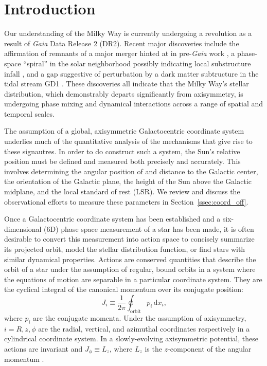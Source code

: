 \documentclass[twocolumn]{aastex62}
\newcommand{\beq}{\begin{equation}}
\newcommand{\eeq}{\end{equation}}
\begin{document}

\section{Introduction} \label{sec:intro} Our understanding of the Milky Way is
currently undergoing a revolution as a result of \textit{Gaia} Data Release 2
(DR2). Recent major discoveries include the affirmation of remnants of a major
merger \citep{2018ApJ...860L..11K, 2018MNRAS.478..611B, 2018Natur.563...85H,
2019MNRAS.486..378L, 2019MNRAS.482.3426M} hinted at in pre-\textit{Gaia} work
\citep[e.g.,][]{2005MNRAS.359...93M, 2011MNRAS.412.1203N}, a phase-space
``spiral'' in the solar neighborhood \citep{2018Natur.561..360A} possibly
indicating local substructure infall \citep{2018MNRAS.481.1501B,
2019MNRAS.485.3134L}, and a gap suggestive of perturbation by a dark matter
subtructure in the tidal stream GD1 \citep{2018ApJ...863L..20P,
2018arXiv181103631B}. These discoveries all indicate that the Milky Way's
stellar distribution, which demonstrably departs significantly from axisymmetry,
is undergoing phase mixing and dynamical interactions across a range of spatial
and temporal scales.

The assumption of a global, axisymmetric Galactocentric coordinate system
\citep{2008gady.book.....B} underlies much of the quantitative analysis of the
mechanisms that give rise to these signautres. In order to do construct such a
system, the Sun's relative position must be defined and measured both precisely
and accurately. This involves determining the angular position of and distance
to the Galactic center, the orientation of the Galactic plane, the height of the
Sun above the Galactic midplane, and the local standard of rest (LSR). We review
and discuss the observational efforts to measure these parameters in
Section~\ref{ssec:coord_off}.

Once a Galactocentric coordinate system has been established and a
six-dimensional (6D) phase space measurement of a star has been made, it is
often desirable to convert this measurement into action space to concisely
summarize its projected orbit, model the stellar distribution function, or find
stars with similar dynamical properties. Actions are conserved quantities that
describe the orbit of a star under the assumption of regular, bound orbits in a
system where the equations of motion are separable in a particular coordinate
system. They are the cyclical integral of the canonical momentum over its
conjugate position: \beq\label{eq:actions} J_i \equiv \frac{1}{2\pi}
\oint_{\text{orbit}}p_i\,\text{d}x_i\text{,} \eeq where $p_i$ are the conjugate
momenta. Under the assumption of axisymmetry, $i=R,z,\phi$ are the radial,
vertical, and azimuthal coordinates respectively in a cylindrical coordinate
system. In a slowly-evolving axisymmetric potential, these actions are invariant
and $J_{\phi} \equiv L_z$, where $L_z$ is the $z$-component of the angular
momentum \citep{2008gady.book.....B,2014RvMP...86....1S}.
\end{document}
